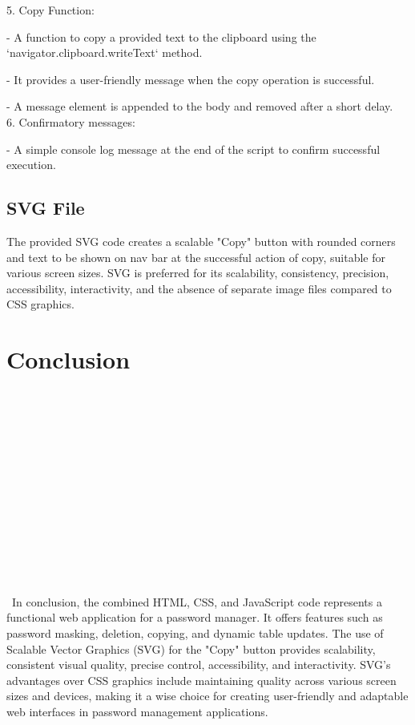 \documentclass{article}
\begin{document}
\begin{itemsize}
    

5. Copy  Function:
   \item  - A function to copy a provided text to the clipboard using the `navigator.clipboard.writeText` method.
    \item - It provides a user-friendly message when the copy operation is successful.
    \item - A message element is appended to the body and removed after a short delay.\\
   
    
6. Confirmatory messages:
    \item - A simple console log message at the end of the script to confirm successful execution.\\

    


\subsection{SVG File}
The provided SVG code creates a scalable "Copy" button with rounded corners and text to be shown on nav bar at the successful action of copy, suitable for various screen sizes. SVG is preferred for its scalability, consistency, precision, accessibility, interactivity, and the absence of separate image files compared to CSS graphics.

\section{Conclusion}\\\\\\\\\\\\\\\\\\\\\\\\\\\
In conclusion, the combined HTML, CSS, and JavaScript code represents a functional web application for a password manager. It offers features such as password masking, deletion, copying, and dynamic table updates. The use of Scalable Vector Graphics (SVG) for the "Copy" button provides scalability, consistent visual quality, precise control, accessibility, and interactivity. SVG's advantages over CSS graphics include maintaining quality across various screen sizes and devices, making it a wise choice for creating user-friendly and adaptable web interfaces in password management applications.
\break
\end{itemsize}
\end{document}
